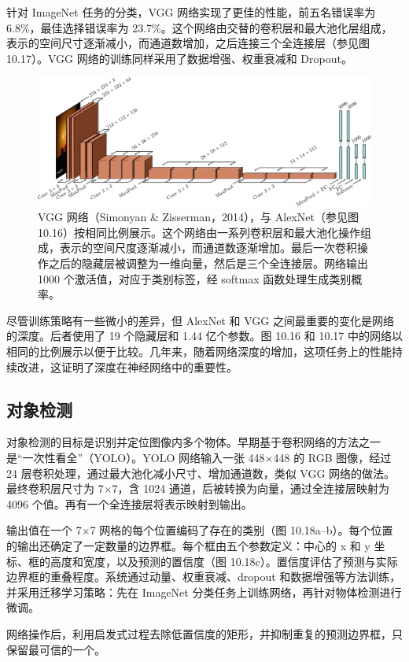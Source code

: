针对 ImageNet 任务的分类，VGG 网络实现了更佳的性能，前五名错误率为 6.8\%，最佳选择错误率为 23.7\%。这个网络由交替的卷积层和最大池化层组成，表示的空间尺寸逐渐减小，而通道数增加，之后连接三个全连接层（参见图 10.17）。VGG 网络的训练同样采用了数据增强、权重衰减和 Dropout。


\begin{figure}[ht!]
	\centering
	\includegraphics[width=0.7\linewidth]{png/chapter10/ConvVGG.png}
	\caption{VGG 网络（Simonyan \& Zisserman，2014），与 AlexNet（参见图 10.16）按相同比例展示。这个网络由一系列卷积层和最大池化操作组成，表示的空间尺度逐渐减小，而通道数逐渐增加。最后一次卷积操作之后的隐藏层被调整为一维向量，然后是三个全连接层。网络输出 1000 个激活值，对应于类别标签，经 softmax 函数处理生成类别概率。}
\end{figure}


尽管训练策略有一些微小的差异，但 AlexNet 和 VGG 之间最重要的变化是网络的深度。后者使用了 19 个隐藏层和 1.44 亿个参数。图 10.16 和 10.17 中的网络以相同的比例展示以便于比较。几年来，随着网络深度的增加，这项任务上的性能持续改进，这证明了深度在神经网络中的重要性。

\subsection{对象检测}
对象检测的目标是识别并定位图像内多个物体。早期基于卷积网络的方法之一是“一次性看全”（YOLO）。YOLO 网络输入一张 448×448 的 RGB 图像，经过 24 层卷积处理，通过最大池化减小尺寸、增加通道数，类似 VGG 网络的做法。最终卷积层尺寸为 7×7，含 1024 通道，后被转换为向量，通过全连接层映射为 4096 个值。再有一个全连接层将表示映射到输出。

输出值在一个 7×7 网格的每个位置编码了存在的类别（图 10.18a–b）。每个位置的输出还确定了一定数量的边界框。每个框由五个参数定义：中心的 x 和 y 坐标、框的高度和宽度，以及预测的置信度（图 10.18c）。置信度评估了预测与实际边界框的重叠程度。系统通过动量、权重衰减、dropout 和数据增强等方法训练，并采用迁移学习策略：先在 ImageNet 分类任务上训练网络，再针对物体检测进行微调。

网络操作后，利用启发式过程去除低置信度的矩形，并抑制重复的预测边界框，只保留最可信的一个。


